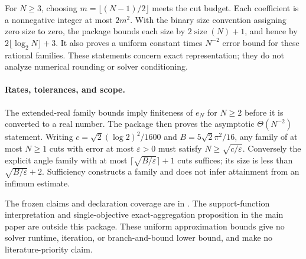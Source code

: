 For $N\geq3$, choosing $m=\lfloor(N-1)/2\rfloor$ meets the cut budget.
Each coefficient is a nonnegative integer at most $2m^2$. With the binary
size convention assigning zero size to zero, the package bounds each size
by $2\operatorname{size}(N)+1$, and hence by
$2\lfloor\log_2 N\rfloor+3$. It also proves a uniform constant times
$N^{-2}$ error bound for these rational families. These statements concern
exact representation; they do not analyze numerical rounding or solver
conditioning.

\paragraph{Rates, tolerances, and scope.}
The extended-real family bounds imply finiteness of $e_N$ for $N\geq2$
before it is converted to a real number. The package then proves the
asymptotic $\Theta(N^{-2})$ statement. Writing
$c=\sqrt2(\log2)^2/1600$ and $B=5\sqrt2\pi^2/16$, any family of at most
$N\geq1$ cuts with error at most $\varepsilon>0$ must satisfy
$N\geq\sqrt{c/\varepsilon}$. Conversely the explicit angle family with at most
$\lceil\sqrt{B/\varepsilon}\rceil+1$ cuts suffices; its size is less than
$\sqrt{B/\varepsilon}+2$. Sufficiency constructs a family and does not
infer attainment from an infimum estimate.

The frozen claims and declaration coverage
are in . The support-function
interpretation and single-objective exact-aggregation proposition in the
main paper are outside this package. These uniform approximation
bounds give no solver runtime, iteration, or branch-and-bound lower bound,
and make no literature-priority claim.
